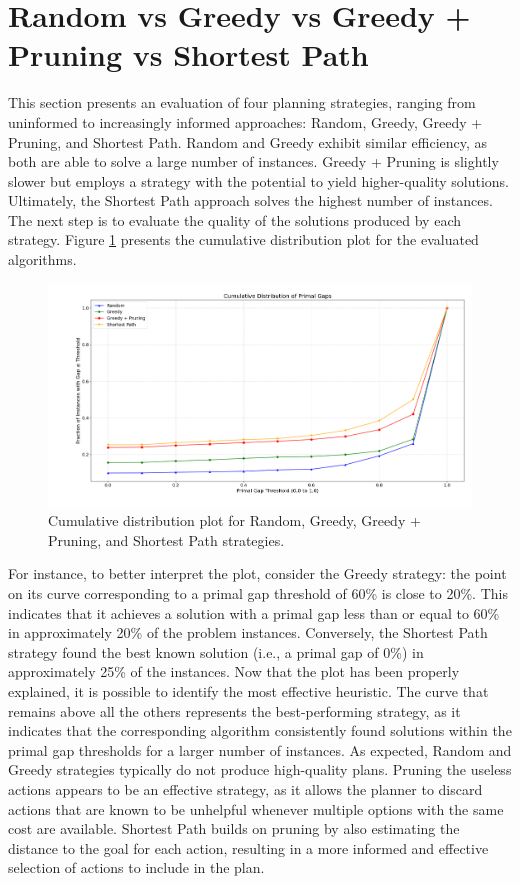 \section{Random vs Greedy vs Greedy + Pruning vs Shortest Path}
This section presents an evaluation of four planning strategies, ranging from uninformed to increasingly informed approaches:
Random, Greedy, Greedy + Pruning, and Shortest Path.
Random and Greedy exhibit similar efficiency, as both are able to solve a large number of instances. Greedy + Pruning is
slightly slower but employs a strategy with the potential to yield higher-quality solutions. Ultimately, the Shortest Path approach
solves the highest number of instances. The next step is to evaluate the quality of the solutions produced by each strategy.
Figure \ref{fig:rgps} presents the cumulative distribution plot for the evaluated algorithms.

\begin{figure}[ht]
	\centering
	\includegraphics[width=\textwidth]{images/algs0124.png}
	\caption{Cumulative distribution plot for Random, Greedy, Greedy + Pruning, and Shortest Path strategies.}
	\label{fig:rgps}
\end{figure}

For instance, to better interpret the plot, consider the Greedy strategy: the point on its curve corresponding to
a primal gap threshold of 60\% is close to 20\%. This indicates that it achieves a solution with a primal gap less than
or equal to 60\% in approximately 20\% of the problem instances.
Conversely, the Shortest Path strategy found the best known solution (i.e., a primal gap of 0\%) in approximately
25\% of the instances.
Now that the plot has been properly explained, it is possible to identify the most effective heuristic.
The curve that remains above all the others represents the best-performing strategy, as it indicates that the corresponding
algorithm consistently found solutions within the primal gap thresholds for a larger number of instances.
As expected, Random and Greedy strategies typically do not produce high-quality plans. Pruning the useless actions appears to be
an effective strategy, as it allows the planner to discard actions that are known to be unhelpful whenever multiple
options with the same cost are available.
Shortest Path builds on pruning by also estimating the distance to the goal for each action, resulting in a more
informed and effective selection of actions to include in the plan.

